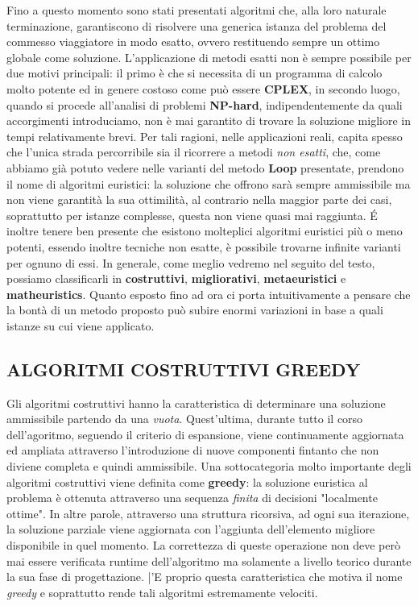 \documentclass[11pt]{article}
\begin{document}
Fino a questo momento sono stati presentati algoritmi che, alla loro naturale terminazione, garantiscono di risolvere una generica istanza del problema del commesso viaggiatore in modo esatto, ovvero restituendo sempre un ottimo globale come soluzione.
L'applicazione di metodi esatti non è sempre possibile per due motivi principali: il primo è che si necessita di un programma di calcolo molto potente ed in genere costoso come può essere \textbf{CPLEX}, in secondo luogo, quando si procede all'analisi di problemi \textbf{NP-hard}, indipendentemente da quali accorgimenti introduciamo, non è mai garantito di trovare la soluzione migliore in tempi relativamente brevi.
Per tali ragioni, nelle applicazioni reali, capita spesso che l'unica strada percorribile sia il ricorrere a metodi \textit{non esatti}, che, come abbiamo già potuto vedere nelle varianti del metodo \textbf{Loop} presentate, prendono il nome di algoritmi euristici: la soluzione che offrono sarà sempre ammissibile ma non viene garantità la sua ottimilità, al contrario nella maggior parte dei casi, soprattutto per istanze complesse, questa non viene quasi mai raggiunta. \'E inoltre tenere ben presente che esistono molteplici algoritmi euristici più o meno potenti, essendo inoltre tecniche non esatte, è possibile trovarne infinite varianti per ognuno di essi. In generale, come meglio vedremo nel seguito del testo, possiamo classificarli in \textbf{costruttivi}, \textbf{migliorativi}, \textbf{metaeuristici} e \textbf{matheuristics}.
Quanto esposto fino ad ora ci porta intuitivamente a pensare che la bontà di un metodo proposto può subire enormi variazioni in base a quali istanze su cui viene applicato.

\subsection*{ALGORITMI COSTRUTTIVI GREEDY}
\label{sec:GreedyS}

Gli algoritmi costruttivi hanno la caratteristica di determinare una soluzione ammissibile partendo da una \textit{vuota}. Quest'ultima, durante tutto il corso dell'agoritmo, seguendo il criterio di espansione, viene continuamente aggiornata ed ampliata attraverso l'introduzione di nuove componenti fintanto che non diviene completa e quindi ammissibile.
Una sottocategoria molto importante degli algoritmi costruttivi viene definita come \textbf{greedy}: la soluzione euristica al problema è ottenuta attraverso una sequenza \textit{finita} di decisioni "localmente ottime". In altre parole, attraverso una struttura ricorsiva, ad ogni sua iterazione, la soluzione parziale viene aggiornata con l'aggiunta dell'elemento migliore disponibile in quel momento. La correttezza di queste operazione non deve però mai essere verificata runtime dell'algoritmo ma solamente a livello teorico durante la sua fase di progettazione. |'E proprio questa caratteristica che motiva il nome \textit{greedy} e soprattutto rende tali algoritmi estremamente velociti.
\end{document}
